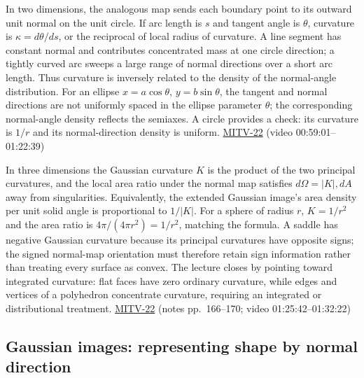 In two dimensions, the analogous map sends each boundary point to its outward unit normal on the unit circle. If arc length is \(s\) and tangent angle is \(\theta\), curvature is \(\kappa=d\theta/ds\), or the reciprocal of local radius of curvature. A line segment has constant normal and contributes concentrated mass at one circle direction; a tightly curved arc sweeps a large range of normal directions over a short arc length. Thus curvature is inversely related to the density of the normal-angle distribution. For an ellipse \(x=a\cos\theta\), \(y=b\sin\theta\), the tangent and normal directions are not uniformly spaced in the ellipse parameter \(\theta\); the corresponding normal-angle density reflects the semiaxes. A circle provides a check: its curvature is \(1/r\) and its normal-direction density is uniform. \hyperref[04-visual-computing-ii-ch036-mitv-22---exterior-orientation-recovering-position-orientation-bundle-adjustment-object-shape]{MITV-22} (video 00:59:01--01:22:39)

In three dimensions the Gaussian curvature \(K\) is the product of the two principal curvatures, and the local area ratio under the normal map satisfies \(d\Omega=|K|,dA\) away from singularities. Equivalently, the extended Gaussian image's area density per unit solid angle is proportional to \(1/|K|\). For a sphere of radius \(r\), \(K=1/r^2\) and the area ratio is \(4\pi/(4\pi r^2)=1/r^2\), matching the formula. A saddle has negative Gaussian curvature because its principal curvatures have opposite signs; the signed normal-map orientation must therefore retain sign information rather than treating every surface as convex. The lecture closes by pointing toward integrated curvature: flat faces have zero ordinary curvature, while edges and vertices of a polyhedron concentrate curvature, requiring an integrated or distributional treatment. \hyperref[04-visual-computing-ii-ch036-mitv-22---exterior-orientation-recovering-position-orientation-bundle-adjustment-object-shape]{MITV-22} (notes pp.~166--170; video 01:25:42--01:32:22)

\subsection{Gaussian images: representing shape by normal direction}\label{04-visual-computing-ii-ch032-gaussian-images-representing-shape-by-normal-direction}

\hypertarget{04-visual-computing-ii-ch032-gaussian-images-representing-shape-by-normal-direction}{}

